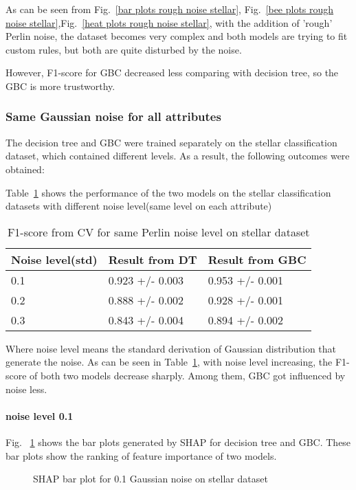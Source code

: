 \documentclass[runningheads,a4paper]{llncs}
\begin{document}
As can be seen from Fig.~\ref{bar plots rough noise stellar}, Fig.~\ref{bee plots rough noise stellar},Fig.~\ref{heat plots rough noise stellar}, with the addition of 'rough' Perlin noise, the dataset becomes very complex and both models are trying to fit custom rules, but both are quite disturbed by the noise.

However, F1-score for GBC decreased less comparing with decision tree, so the GBC is more trustworthy.

\subsubsection{Same Gaussian noise for all attributes}
The decision tree and GBC were trained separately on the stellar classification dataset, which contained different levels. As a result, the following outcomes were obtained:

Table~\ref{result from same stellar G} shows the performance of the two models on the stellar classification datasets with different noise level(same level on each attribute)

\begin{table}[H]
	\centering
	\caption{F1-score from CV for same Perlin noise level on stellar dataset}
	\label{result from same stellar G}
	\begin{tabular}{|l|l|l|}
		\hline
		Noise level(std) & Result from DT  &Result from GBC\\
		\hline
		0.1& 0.923 +/- 0.003& 0.953 +/- 0.001 \\
		0.2 & 0.888 +/- 0.002 & 0.928 +/- 0.001 \\
		0.3 & 0.843 +/- 0.004 & 0.894 +/- 0.002 \\
		\hline
	\end{tabular}
\end{table}

Where noise level means the standard derivation of Gaussian distribution that generate the noise.
As can be seen in Table~\ref{result from same stellar G}, with noise level increasing, the F1-score of both two models decrease sharply. Among them, GBC got influenced by noise less.

\paragraph{noise level 0.1}
Fig. ~\ref{bar plots 0.1 noise stellar} shows the bar plots generated by SHAP for decision tree and GBC. These bar plots show the ranking of feature importance of two models.
\begin{figure}[H]
	\centering
	
	\hfill
	
	
	\caption{SHAP bar plot for 0.1 Gaussian noise on stellar dataset}
	\label{bar plots 0.1 noise stellar}
\end{figure}
\end{document}
